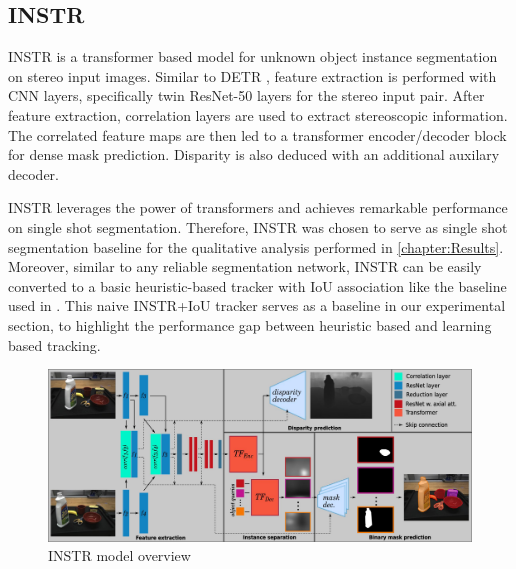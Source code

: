 


\subsection{INSTR}\label{subseq:instr}



INSTR \parencite{durner2021unknown} is a transformer based model for unknown object instance segmentation on stereo input images. Similar to DETR \parencite{DETR}, feature extraction is performed with CNN layers, specifically twin ResNet-50 layers for the stereo input pair. After feature extraction, correlation layers \parencite{flownet} are used to extract stereoscopic information. The correlated feature maps are then led to a transformer encoder/decoder block for dense mask prediction. Disparity is also deduced with an additional auxilary decoder. \par
\newpage
INSTR leverages the power of transformers and achieves remarkable performance on single shot segmentation. Therefore, INSTR was chosen to serve as single shot segmentation baseline for the qualitative analysis performed in \autoref{chapter:Results}. Moreover, similar to any reliable segmentation network, INSTR can be easily converted to a basic heuristic-based tracker with IoU association like the baseline used in \parencite{step}. This naive INSTR+IoU tracker serves as a baseline in our experimental section, to highlight the performance gap between heuristic based and learning based tracking. \par

\begin{figure} [ht!]
    \centering
    \includegraphics[width=1.\linewidth]{figures/04_setup/arch_final.pdf}
    \caption{INSTR model overview}
    \label{fig:instr}
    
\end{figure}

